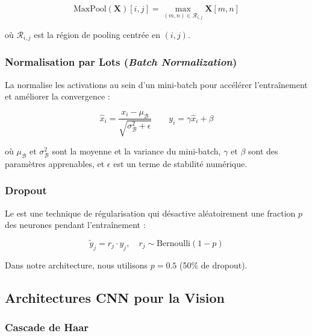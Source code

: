 \begin{equation}
\text{MaxPool}(\mathbf{X})[i, j] = \max_{(m, n) \in \mathcal{R}_{i,j}} \mathbf{X}[m, n]
\label{eq:maxpool}
\end{equation}

où $\mathcal{R}_{i,j}$ est la région de pooling centrée en $(i, j)$.

\subsubsection{Normalisation par Lots (\textit{Batch Normalization})}

La  \cite{ioffe2015} normalise les activations au sein d'un mini-batch pour accélérer l'entraînement et améliorer la convergence :

\begin{equation}
\hat{x}_i = \frac{x_i - \mu_{\mathcal{B}}}{\sqrt{\sigma_{\mathcal{B}}^2 + \epsilon}} \qquad y_i = \gamma \hat{x}_i + \beta
\label{eq:batchnorm}
\end{equation}

où $\mu_{\mathcal{B}}$ et $\sigma_{\mathcal{B}}^2$ sont la moyenne et la variance du mini-batch, $\gamma$ et $\beta$ sont des paramètres apprenables, et $\epsilon$ est un terme de stabilité numérique.

\subsubsection{Dropout}

Le  \cite{srivastava2014} est une technique de régularisation qui désactive aléatoirement une fraction $p$ des neurones pendant l'entraînement :

\begin{equation}
\tilde{y}_j = r_j \cdot y_j, \quad r_j \sim \text{Bernoulli}(1 - p)
\label{eq:dropout}
\end{equation}

Dans notre architecture, nous utilisons $p = 0.5$ (50\% de dropout).

\subsection{Architectures CNN pour la Vision}

\subsubsection{Cascade de Haar}

